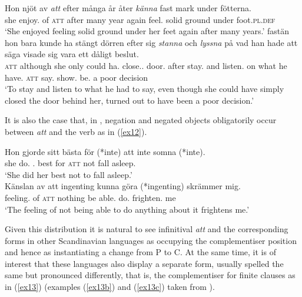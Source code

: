 \documentclass[output=paper]{langsci/langscibook}
\begin{document}
\begin{exe}
\ex\label{ex11} 
\begin{xlist}
\ex
\gll Hon nj\"ot av {\itshape  att} efter m\aa nga	\aa r \aa ter {\itshape  k\"anna} fast mark under f\"otterna.\\
she enjoy.\Pst{} of \textsc{att} after many year again feel.\Inf{} solid ground under foot.\textsc{pl.def}\\\trans
\enquote*{She enjoyed feeling solid ground under her feet again after many years.}
\ex{} fast\"an hon bara kunde ha st\"angt d\"orren efter sig {\itshape  stanna}	och {\itshape  lyssna} {p\aa} vad han hade att s\"aga visade sig vara ett d\aa ligt beslut.\\	\textsc{att}	although she only could ha.\Inf{} close.\Pst.\Ptcp{} door.\Def{} after \Refl{} stay.\Inf{} and listen.\Inf{} on  what he have.\Pst{} \textsc{att} say.\Inf{} show.\Pst{} \Refl{} be.\Inf{} a poor decision\\\trans \enquote*{To stay and listen to what he had to say, even though she could have simply closed the door behind her, turned out to have been a poor decision.}
\end{xlist}
\end{exe}

It is also the case that, in , negation and negated objects
obligatorily occur between \emph{att} and the verb as in (\ref{ex12}).\largerpage[1]

\begin{exe}
\ex\label{ex12} 
\begin{xlist}
\ex
\gll Hon gjorde sitt b\"asta f\"or (*inte) att inte somna (*inte).\\
she do.\Pst{} \Refl.\Poss{} best for {} \textsc{att} not {fall asleep.\Inf{}} {}\\
\trans \enquote*{She did her best not to fall asleep.}\\
\ex
\gll K\"anslan av att ingenting kunna g\"ora (*ingenting) skr\"ammer mig.\\
feeling.\Def{} of \textsc{att} nothing {be able.\Inf{}} do.\Inf{} {} frighten.\Prs{} me\\
\trans \enquote*{The feeling of not being able to do anything about it frightens me.}
\end{xlist}
\end{exe}

Given this distribution it is natural to see  infinitival
\emph{att} and the corresponding forms in other Scandinavian languages as
occupying the complementiser position and hence as instantiating a change from
P to C. At the same time, it is of interest that these languages also display a
separate form, usually spelled the same but pronounced differently, that is,
the complementiser for finite clauses as in (\ref{ex13})
(examples (\ref{ex13b}) and (\ref{ex13c}) taken from \citealt{NordBoye16}).
\end{document}
